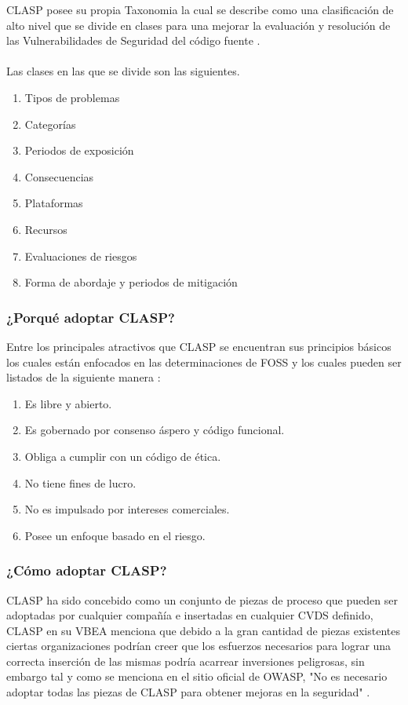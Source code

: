 \documentclass[runningheads,a4paper]{llncs}
\begin{document}
 \gls{CLASP} posee su propia \gls{Taxonomia} la cual se describe como una clasificación de alto nivel que se divide en clases para una mejorar la evaluación y resolución de las Vulnerabilidades de Seguridad del código fuente \cite{CLASPConcepts}.
\\\\
Las clases en las que se divide son las siguientes.
\\
\begin{enumerate}
	\item Tipos de problemas
	\item Categorías
	\item Periodos de exposición
	\item Consecuencias
	\item Plataformas
	\item Recursos
	\item Evaluaciones de riesgos
	\item Forma de abordaje y periodos de mitigación
\end{enumerate}

\subsubsection{¿Porqué adoptar \gls{CLASP}?}
Entre los principales atractivos que \gls{CLASP} se encuentran sus principios básicos los cuales están enfocados en las determinaciones de \gls{FOSS} y los cuales pueden ser listados de la siguiente manera \cite{CLASPConcepts}:

\begin{enumerate}
	\item Es libre y abierto. 
	\item Es gobernado por consenso áspero y código funcional.
	\item Obliga a cumplir con un código de ética.
	\item No tiene fines de lucro.
	\item No es impulsado por intereses comerciales.
	\item Posee un enfoque basado en el riesgo.
\end{enumerate}

\subsubsection{¿Cómo adoptar \gls{CLASP}?}
\gls{CLASP} ha sido concebido como un conjunto de piezas de proceso que pueden ser adoptadas por cualquier compañía e insertadas en cualquier \gls{CVDS} definido, \gls{CLASP} en su \gls{VBEA} menciona que debido a la gran cantidad de piezas existentes ciertas organizaciones podrían creer que los esfuerzos necesarios para lograr una correcta inserción de las mismas podría acarrear inversiones peligrosas, sin embargo tal y como se menciona en el sitio oficial de \gls{OWASP}, "No es necesario adoptar todas las piezas de \gls{CLASP} para obtener mejoras en la seguridad" \cite{AAViewCLAPS}.\\
\end{document}
